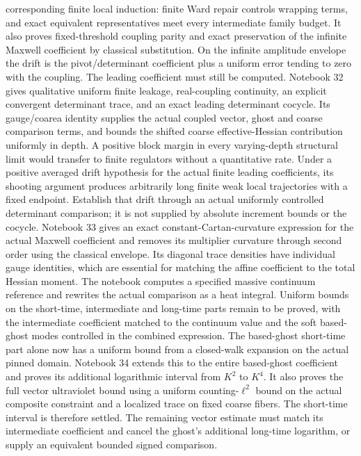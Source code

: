\documentclass[11pt]{article}
\theoremstyle{remark}
\begin{document}
\begin{enumerate}
corresponding finite local induction: finite Ward repair controls
wrapping terms, and exact equivalent representatives meet every
intermediate family budget. It also proves fixed-threshold
coupling parity and exact preservation of the infinite Maxwell
coefficient by classical substitution. On the infinite amplitude
envelope the drift is the pivot/determinant coefficient plus a
uniform error tending to zero with the coupling. The leading
coefficient must still be computed. Notebook 32 gives qualitative
uniform finite leakage, real-coupling continuity, an explicit
convergent determinant trace, and an exact leading determinant
cocycle. Its gauge/coarea identity supplies the actual coupled
vector, ghost and coarse comparison terms, and bounds the shifted
coarse effective-Hessian contribution uniformly in depth.
A positive block margin
in every varying-depth structural limit would transfer to finite
regulators without a quantitative rate.
Under a positive averaged drift hypothesis for the actual
finite leading coefficients, its shooting argument produces
arbitrarily long finite weak local trajectories with a fixed
endpoint. Establish that drift through an actual uniformly
controlled determinant comparison; it is not supplied by absolute
increment bounds or the cocycle.
Notebook 33 gives an exact constant-Cartan-curvature expression
for the actual Maxwell coefficient and removes its multiplier
curvature through second order using the classical envelope.
Its diagonal trace densities have individual gauge identities,
which are essential for matching the affine coefficient to the
total Hessian moment. The notebook computes a specified massive
continuum reference and rewrites the actual comparison as a
heat integral. Uniform bounds on the short-time, intermediate
and long-time parts remain to be proved, with the intermediate
coefficient matched to the continuum value and the soft
based-ghost modes controlled in the combined expression.
The based-ghost short-time part alone now has a uniform
bound from a closed-walk expansion on the actual pinned domain.
Notebook 34 extends this to the entire based-ghost coefficient
and proves its additional logarithmic interval from \(K^2\)
to \(K^4\). It also proves the full vector ultraviolet bound
using a uniform counting-\(\ell^2\) bound on the actual
composite constraint and a localized trace on fixed coarse
fibers. The short-time interval is therefore settled.
The remaining vector estimate must match its intermediate
coefficient and cancel the ghost's additional long-time
logarithm, or supply an equivalent bounded signed comparison.

\end{enumerate}
\end{document}
